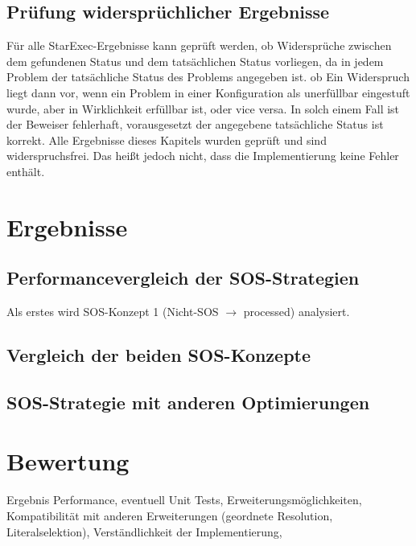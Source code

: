 	\subsection{Prüfung widersprüchlicher Ergebnisse}
		Für alle StarExec-Ergebnisse kann geprüft werden, ob Widersprüche zwischen dem gefundenen Status und dem tatsächlichen Status vorliegen, da in jedem Problem der tatsächliche Status des Problems angegeben ist. ob  Ein Widerspruch liegt dann vor, wenn ein Problem in einer Konfiguration als unerfüllbar eingestuft wurde, aber in Wirklichkeit erfüllbar ist, oder vice versa. In solch einem Fall ist der Beweiser fehlerhaft, vorausgesetzt der angegebene tatsächliche Status ist korrekt. Alle Ergebnisse dieses Kapitels wurden geprüft und sind widerspruchsfrei. Das heißt jedoch nicht, dass die Implementierung keine Fehler enthält.

\section{Ergebnisse}
	\subsection{Performancevergleich der SOS-Strategien}
	 	Als erstes wird SOS-Konzept 1 (Nicht-SOS $\rightarrow$ processed) analysiert. 
			

	
	\subsection{Vergleich der beiden SOS-Konzepte}
	\subsection{SOS-Strategie mit anderen Optimierungen}
	
\section{Bewertung}

Ergebnis Performance,
eventuell Unit Tests,
Erweiterungsmöglichkeiten,
Kompatibilität mit anderen Erweiterungen (geordnete Resolution, Literalselektion),
Verständlichkeit der Implementierung,


